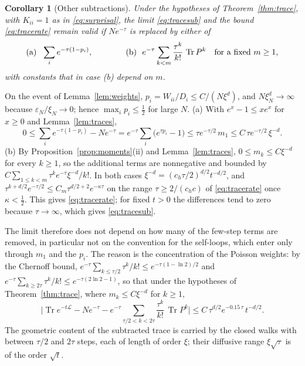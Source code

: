 \documentclass[11pt,a4paper]{article}
\makeatletter
\theoremstyle{stmt}
\newtheorem{corollary}[theorem]{Corollary}
\theoremstyle{defn}
\theoremstyle{rmk}
\renewenvironment{proof}[1][\proofname]{\par\pushQED{\qed}\normalfont\topsep6\p@\@plus6\p@\relax
  \trivlist\item[\hskip\labelsep{\sffamily\itshape\small #1.}]\ignorespaces}{\popQED\endtrivlist\@endpefalse}
\numberwithin{equation}{section}
\DeclareMathOperator{\Tr}{Tr}
\newcommand{\Lc}{\mathcal{L}}
\makeatother
\begin{document}
{\begin{corollary}[Other subtractions]\label{cor:subtractions}
Under the hypotheses of Theorem~\ref{thm:trace}, with $K_{ii}=1$ as in \eqref{eq:surprisal}, the limit \eqref{eq:tracesub} and the bound \eqref{eq:tracerate} remain valid if $Ne^{-\tau}$ is replaced by either of
\[
\textup{(a)}\ \ \sum_ie^{-\tau(1-p_i)},\qquad\qquad\textup{(b)}\ \ e^{-\tau}\sum_{k<m}\frac{\tau^k}{k!}\,\Tr P^k\quad\text{for a fixed }m\ge1,
\]
with constants that in case \textup{(b)} depend on $m$.
\end{corollary}

\begin{proof}
On the event of Lemma~\ref{lem:weights}, $p_i=W_{ii}/D_i\le C/(N\xi^d)$, and $N\xi_N^d\to\infty$ because $\varepsilon_N/\xi_N\to0$; hence $\max_ip_i\le\tfrac12$ for large $N$. (a) With $e^x-1\le xe^x$ for $x\ge0$ and Lemma~\ref{lem:traces},
\[
0\le\sum_ie^{-\tau(1-p_i)}-Ne^{-\tau}=e^{-\tau}\sum_i\big(e^{\tau p_i}-1\big)\le\tau e^{-\tau/2}\,m_1\le C\,\tau e^{-\tau/2}\,\xi^{-d}.
\]
(b) By Proposition~\ref{prop:moments}(ii) and Lemma~\ref{lem:traces}, $0\le m_k\le C\xi^{-d}$ for every $k\ge1$, so the additional terms are nonnegative and bounded by $C\sum_{1\le k<m}\tau^ke^{-\tau}\xi^{-d}/k!$. In both cases $\xi^{-d}=(c_h\tau/2)^{d/2}t^{-d/2}$, and $\tau^{k+d/2}e^{-\tau/2}\le C_m\tau^{d/2+2}e^{-\kappa\tau}$ on the range $\tau\ge2/(c_hc)$ of \eqref{eq:tracerate} once $\kappa<\tfrac12$. This gives \eqref{eq:tracerate}; for fixed $t>0$ the differences tend to zero because $\tau\to\infty$, which gives \eqref{eq:tracesub}.
\end{proof}

The limit therefore does not depend on how many of the few-step terms are removed, in particular not on the convention for the self-loops, which enter only through $m_1$ and the $p_i$. The reason is the concentration of the Poisson weights: by the Chernoff bound, $e^{-\tau}\sum_{k\le\tau/2}\tau^k/k!\le e^{-\tau(1-\ln2)/2}$ and $e^{-\tau}\sum_{k\ge2\tau}\tau^k/k!\le e^{-\tau(2\ln2-1)}$, so that under the hypotheses of Theorem~\ref{thm:trace}, where $m_k\le C\xi^{-d}$ for $k\ge1$,
\begin{equation}\label{eq:window}
\Big|\Tr e^{-t\Lc}-Ne^{-\tau}-e^{-\tau}\!\!\sum_{\tau/2<k<2\tau}\frac{\tau^k}{k!}\,\Tr P^k\Big|\le C\,\tau^{d/2}e^{-0.15\,\tau}\,t^{-d/2}.
\end{equation}
The geometric content of the subtracted trace is carried by the closed walks with between $\tau/2$ and $2\tau$ steps, each of length of order $\xi$; their diffusive range $\xi\sqrt\tau$ is of the order $\sqrt t$.

}
\end{document}
